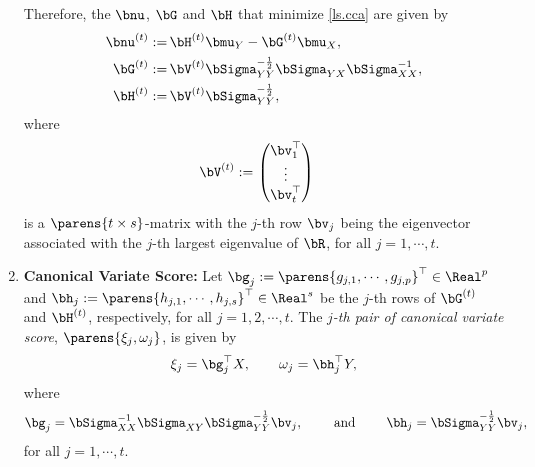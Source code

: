 \documentclass[12pt]{article}
\begin{document}
\begin{enumerate}[label=\textbf{\arabic*.}]
	Therefore, the $\bnu$, $\bG$ and $\bH$ that minimize \eqref{ls.cca} are given by
	\begin{align*}
		\bnu^{(t)} := & \, \bH^{(t)} \bmu_Y - \bG^{(t)} \bmu_X, \\ 
		\bG^{(t)} := & \, \bV^{(t)} \bSigma_{YY}^{-\frac{1}{2}} \bSigma_{YX} \bSigma_{XX}^{-1}, \\ 
		\bH^{(t)} := & \, \bV^{(t)} \bSigma_{YY}^{-\frac{1}{2}}, 
	\end{align*} 
	where 
	\begin{align*}
		\bV^{(t)} := & \, \begin{pmatrix}
		\bv_1^\top  \\ \vdots \\ \bv_t^\top
		\end{pmatrix} 
	\end{align*}
	is a $\parens{t \times s}$-matrix with the $j$-th row $\bv_j$ being the eigenvector associated with the $j$-th largest eigenvalue of $\bR$, for all $j = 1, \cdots, t$. 
	
	\item \textbf{Canonical Variate Score:} Let $\bg_j := \parens{g_{j,1}, \cdots, g_{j,p}}^\top \in \Real^p$ and $\bh_j := \parens{h_{j,1}, \cdots, h_{j,s}}^\top \in \Real^s$ be the $j$-th rows of $\bG^{(t)}$ and $\bH^{(t)}$, respectively, for all $j = 1, 2, \cdots, t$. The \textit{$j$-th pair of canonical variate score}, $\parens{\xi_j, \omega_j}$, is given by 
	\begin{align}
		\xi_j = \bg_j^\top X, \qquad \omega_j = \bh_j^\top Y, 
	\end{align}
	where 
	\begin{align}
		\bg_j = \bSigma_{XX}^{-1} \bSigma_{XY} \bSigma_{YY}^{-\frac{1}{2}} \bv_j, \qquad \text{ and } \qquad \bh_j = \bSigma_{YY}^{-\frac{1}{2}} \bv_j, 
	\end{align}
	for all $j = 1, \cdots, t$. 
	

\end{enumerate}
\end{document}
